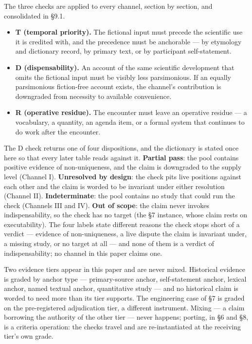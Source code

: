 \documentclass[11pt,a4paper]{article}
\begin{document}
The three checks are applied to every channel, section by section, and consolidated in §9.1.

\begin{itemize}[leftmargin=1.6em,itemsep=2pt,parsep=0pt,topsep=3pt]
\item \textbf{T (temporal priority).} The fictional input must precede the scientific use it is credited with, and the precedence must be anchorable — by etymology and dictionary record, by primary text, or by participant self-statement.
\item \textbf{D (dispensability).} An account of the same scientific development that omits the fictional input must be visibly less parsimonious. If an equally parsimonious fiction-free account exists, the channel's contribution is downgraded from necessity to available convenience.
\item \textbf{R (operative residue).} The encounter must leave an operative residue — a vocabulary, a quantity, an agenda item, or a formal system that continues to do work after the encounter.
\end{itemize}

The D check returns one of four dispositions, and the dictionary is stated once here so that every later table reads against it. \textbf{Partial pass}: the pool contains positive evidence of non-uniqueness, and the claim is downgraded to the supply level (Channel I). \textbf{Unresolved by design}: the check pits live positions against each other and the claim is worded to be invariant under either resolution (Channel II). \textbf{Indeterminate}: the pool contains no study that could run the check (Channels III and IV). \textbf{Out of scope}: the claim never invokes indispensability, so the check has no target (the §7 instance, whose claim rests on executability). The four labels state different reasons the check stops short of a verdict — evidence of non-uniqueness, a live dispute the claim is invariant under, a missing study, or no target at all — and none of them is a verdict of indispensability; no channel in this paper claims one.

Two evidence tiers appear in this paper and are never mixed. Historical evidence is graded by anchor type — primary-source anchor, self-statement anchor, lexical anchor, named textual anchor, quantitative study — and no historical claim is worded to need more than its tier supports. The engineering case of §7 is graded on the pre-registered adjudication tier, a different instrument. Mixing — a claim borrowing the authority of the other tier — never happens; porting, in §6 and §8, is a criteria operation: the checks travel and are re-instantiated at the receiving tier's own grade.
\end{document}
